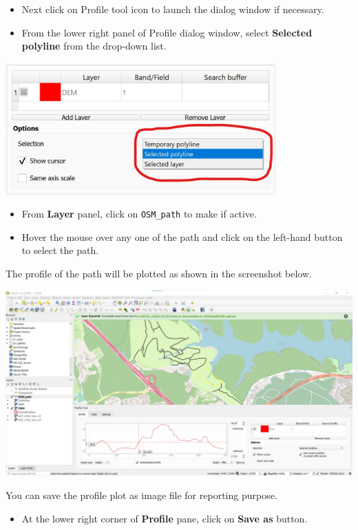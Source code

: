 \documentclass[
  letterpaper,
  DIV=11,
  numbers=noendperiod]{scrreprt}
\providecommand{\tightlist}{%
  \setlength{\itemsep}{0pt}\setlength{\parskip}{0pt}}\usepackage{longtable,booktabs,array}
\begin{document}
\begin{itemize}
\item
  Next click on Profile tool icon to launch the dialog window if
  necessary.
\item
  From the lower right panel of Profile dialog window, select
  \textbf{Selected polyline} from the drop-down list.
\end{itemize}

\includegraphics[width=4.125in,height=\textheight]{./img06/image78.jpg}

\begin{itemize}
\tightlist
\item
  From \textbf{Layer} panel, click on \texttt{OSM\_path} to make if
  active.
\item
  Hover the mouse over any one of the path and click on the left-hand
  button to select the path.
\end{itemize}

The profile of the path will be plotted as shown in the screenshot
below.

\includegraphics{./img06/image79.jpg}

You can save the profile plot as image file for reporting purpose.

\begin{itemize}
\tightlist
\item
  At the lower right corner of \textbf{Profile} pane, click on
  \textbf{Save as} button.
\end{itemize}
\end{document}
